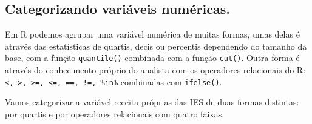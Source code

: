 \documentclass[11pt,]{style/krantz}
\makeatletter
\newenvironment{Shaded}{\begin{snugshade}}{\end{snugshade}}
\newcommand{\DataTypeTok}[1]{\textcolor[rgb]{0.13,0.29,0.53}{#1}}
\newcommand{\DecValTok}[1]{\textcolor[rgb]{0.00,0.00,0.81}{#1}}
\newcommand{\KeywordTok}[1]{\textcolor[rgb]{0.13,0.29,0.53}{\textbf{#1}}}
\newcommand{\NormalTok}[1]{#1}
\newcommand{\OperatorTok}[1]{\textcolor[rgb]{0.81,0.36,0.00}{\textbf{#1}}}
\newcommand{\OtherTok}[1]{\textcolor[rgb]{0.56,0.35,0.01}{#1}}
\newcommand{\StringTok}[1]{\textcolor[rgb]{0.31,0.60,0.02}{#1}}
\newenvironment{kframe}{%
\medskip{}
\setlength{\fboxsep}{.8em}
 \def\at@end@of@kframe{}%
 \ifinner\ifhmode%
  \def\at@end@of@kframe{\end{minipage}}%
  \begin{minipage}{\columnwidth}%
 \fi\fi%
 \def\FrameCommand##1{\hskip\@totalleftmargin \hskip-\fboxsep
 \colorbox{shadecolor}{##1}\hskip-\fboxsep
     \hskip-\linewidth \hskip-\@totalleftmargin \hskip\columnwidth}%
 \MakeFramed {\advance\hsize-\width
   \@totalleftmargin\z@ \linewidth\hsize
   \@setminipage}}%
 {\par\unskip\endMakeFramed%
 \at@end@of@kframe}
\renewenvironment{Shaded}{\begin{kframe}}{\end{kframe}}
\theoremstyle{definition}
\theoremstyle{definition}
\theoremstyle{definition}
\theoremstyle{remark}
\let\BeginKnitrBlock\begin \let\EndKnitrBlock\end
\makeatother
\begin{document}
\hypertarget{categorizando-variaveis-numericas.}{%
\subsection{Categorizando variáveis numéricas.}\label{categorizando-variaveis-numericas.}}

Em R podemos agrupar uma variável numérica de muitas formas, umas delas é através das estatísticas de quartis, decis ou percentis dependendo do tamanho da base, com a função \texttt{quantile()} combinada com a função \texttt{cut()}. Outra forma é através do conhecimento próprio do analista com os operadores relacionais do R: \texttt{\textless{},\ \textgreater{},\ \textgreater{}=,\ \textless{}=,\ ==,\ !=,\ \%in\%} combinadas com \texttt{ifelse()}.

\BeginKnitrBlock{example}
\protect\hypertarget{exm:unnamed-chunk-80}{}{\label{exm:unnamed-chunk-80} }Vamos categorizar a variável receita próprias das IES de duas formas distintas: por quartis e por operadores relacionais com quatro faixas.
\EndKnitrBlock{example}

\begin{Shaded}
\end{Shaded}
\end{document}
